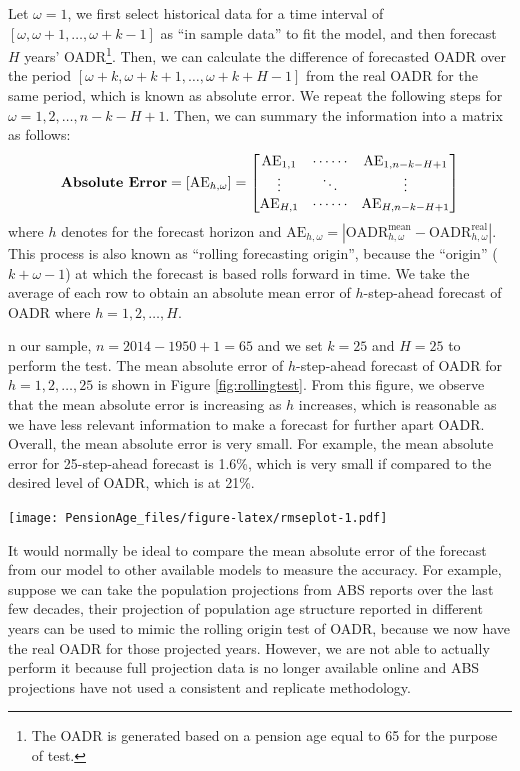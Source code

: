 \documentclass[11pt,a4paper,]{article}
\begin{document}
Let \(\omega=1\), we first select historical data for a time interval of \([\omega,\omega+1,\dots,\omega+k-1]\) as ``in sample data'' to fit the model, and then forecast \(H\) years' OADR\footnote{The OADR is generated based on a pension age equal to 65 for the purpose of test.}. Then, we can calculate the difference of forecasted OADR over the period \([\omega+k,\omega+k+1,\dots,\omega+k+H-1]\) from the real OADR for the same period, which is known as absolute error. We repeat the following steps for \(\omega=1,2,\dots,n-k-H+1\). Then, we can summary the information into a matrix as follows:
\[
  \text{\textbf{Absolute Error}} = [\text{AE}_{h,\omega}] =
    \begin{bmatrix}
      \text{AE}_{1,1} & \cdots\cdots & \text{AE}_{1,n-k-H+1} \\
      \vdots          & \ddots       & \vdots \\
      \text{AE}_{H,1} & \cdots\cdots & \text{AE}_{H,n-k-H+1}
    \end{bmatrix}
\]
where \(h\) denotes for the forecast horizon and \(\text{AE}_{h,\omega}=\left|\text{OADR}^{\text{mean}}_{h,\omega}-\text{OADR}^{\text{real}}_{h,\omega}\right|\). This process is also known as ``rolling forecasting origin'', because the ``origin'' (\(k+\omega-1\)) at which the forecast is based rolls forward in time. We take the average of each row to obtain an absolute mean error of \(h\)-step-ahead forecast of OADR where \(h=1,2,\dots,H\).

n our sample, \(n=2014-1950+1=65\) and we set \(k=25\) and \(H=25\) to perform the test. The mean absolute error of \(h\)-step-ahead forecast of OADR for \(h=1,2,\dots,25\) is shown in Figure \ref{fig:rollingtest}. From this figure, we observe that the mean absolute error is increasing as \(h\) increases, which is reasonable as we have less relevant information to make a forecast for further apart OADR. Overall, the mean absolute error is very small. For example, the mean absolute error for 25-step-ahead forecast is 1.6\%, which is very small if compared to the desired level of OADR, which is at 21\%.

\texttt{[image: PensionAge\_files/figure-latex/rmseplot-1.pdf]}

It would normally be ideal to compare the mean absolute error of the forecast from our model to other available models to measure the accuracy. For example, suppose we can take the population projections from ABS reports over the last few decades, their projection of population age structure reported in different years can be used to mimic the rolling origin test of OADR, because we now have the real OADR for those projected years. However, we are not able to actually perform it because full projection data is no longer available online and ABS projections have not used a consistent and replicate methodology.
\end{document}
